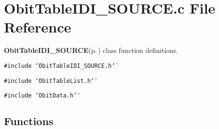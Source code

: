 \section{Obit\-Table\-IDI\_\-SOURCE.c File Reference}
\label{ObitTableIDI__SOURCE_8c}
{\bf Obit\-Table\-IDI\_\-SOURCE}{\rm (p.\,\pageref{structObitTableIDI__SOURCE})} class function definitions. 

{\tt \#include \char`\"{}Obit\-Table\-IDI\_\-SOURCE.h\char`\"{}}\par
{\tt \#include \char`\"{}Obit\-Table\-List.h\char`\"{}}\par
{\tt \#include \char`\"{}Obit\-Data.h\char`\"{}}\par
\subsection*{Functions}
